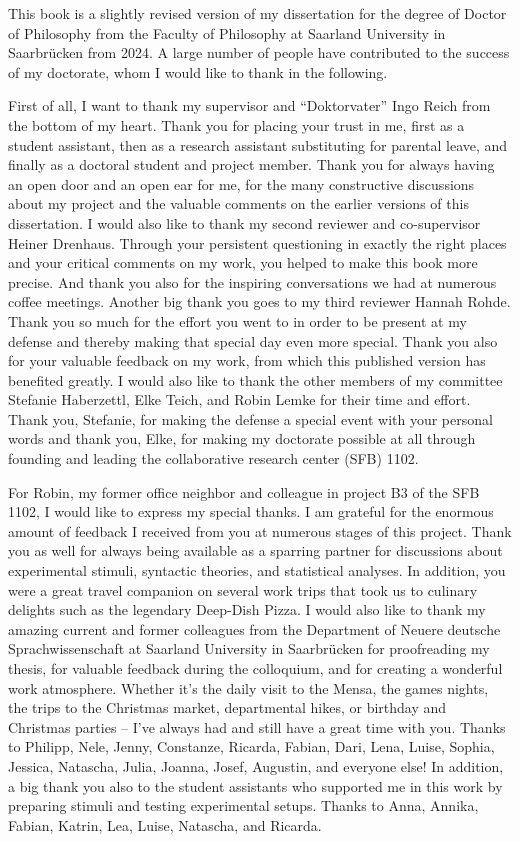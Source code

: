 \addchap{\lsAcknowledgementTitle}
This book is a slightly revised version of my dissertation for the degree of Doctor of Philosophy from the Faculty of Philosophy at Saarland University in Saarbrücken from 2024. A large number of people have contributed to the success of my doctorate, whom I would like to thank in the following.

First of all, I want to thank my supervisor and “Doktorvater” Ingo Reich from the bottom of my heart. Thank you for placing your trust in me, first as a student assistant, then as a research assistant substituting for parental leave, and finally as a doctoral student and project member. Thank you for always having an open door and an open ear for me, for the many constructive discussions about my project and the valuable comments on the earlier versions of this dissertation. 
I would also like to thank my second reviewer and co-supervisor Heiner Drenhaus. Through your persistent questioning in exactly the right places and your critical comments on my work, you helped to make this book more precise. And thank you also for the inspiring conversations we had at numerous coffee meetings.
Another big thank you goes to my third reviewer Hannah Rohde. Thank you so much for the effort you went to in order to be present at my defense and thereby making that special day even more special. Thank you also for your valuable feedback on my work, from which this published version has benefited greatly.
I would also like to thank the other members of my committee Stefanie Haberzettl, Elke Teich, and Robin Lemke for their time and effort. Thank you, Stefanie, for making the defense a special event with your personal words and thank you, Elke, for making my doctorate possible at all through founding and leading the collaborative research center (SFB) 1102.

For Robin, my former office neighbor and colleague in project B3 of the SFB 1102, I would like to express my special thanks. I am grateful for the enormous amount of feedback I received from you at numerous stages of this project. Thank you as well for always being available as a sparring partner for discussions about experimental stimuli, syntactic theories, and statistical analyses. In addition, you were a great travel companion on several work trips that took us to culinary delights such as the legendary Deep-Dish Pizza.
I would also like to thank my amazing current and former colleagues from the Department of Neuere deutsche Sprachwissenschaft at Saarland University in Saarbrücken for proofreading my thesis, for valuable feedback during the colloquium, and for creating a wonderful work atmosphere. Whether it's the daily visit to the Mensa, the games nights, the trips to the Christmas market, departmental hikes, or birthday and Christmas parties -- I've always had and still have a great time with you. Thanks to Philipp, Nele, Jenny, Constanze, Ricarda, Fabian, Dari, Lena, Luise, Sophia, Jessica, Natascha, Julia, Joanna, Josef, Augustin, and everyone else!
In addition, a big thank you also to the student assistants who supported me in this work by preparing stimuli and testing experimental setups. Thanks to Anna, Annika, Fabian, Katrin, Lea, Luise, Natascha, and Ricarda.

